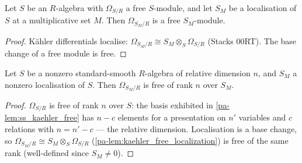 \begin{lemma}
  \label{pa-lem:kaehler_free_localization}
  \leanok

  Let \(S\) be an \(R\)-algebra with \(\Omega_{S/R}\) a free \(S\)-module, and
  let \(S_M\) be a localisation of \(S\) at a multiplicative set \(M\). Then
  \(\Omega_{S_M/R}\) is a free \(S_M\)-module.
\end{lemma}
\begin{proof}
  \leanok
  K\"ahler differentials localise:
  \(\Omega_{S_M/R} \cong S_M \otimes_S \Omega_{S/R}\) (Stacks 00RT). The base
  change of a free module is free.
\end{proof}

\begin{lemma}
  \label{pa-lem:kaehler_rank_localization}
  \leanok

  Let \(S\) be a nonzero standard-smooth \(R\)-algebra of relative dimension
  \(n\), and \(S_M\) a nonzero localisation of \(S\). Then \(\Omega_{S_M/R}\)
  is free of rank \(n\) over \(S_M\).
\end{lemma}
\begin{proof}
  \leanok
  \(\Omega_{S/R}\) is free of rank \(n\) over \(S\): the basis exhibited in
  \ref{pa-lem:ss_kaehler_free} has \(n - c\) elements for a presentation on \(n'\)
  variables and \(c\) relations with \(n = n' - c\) --- the relative dimension.
  Localisation is a base change, so \(\Omega_{S_M/R} \cong S_M \otimes_S
  \Omega_{S/R}\) (\ref{pa-lem:kaehler_free_localization}) is free of the same rank
  (well-defined since \(S_M \neq 0\)).
\end{proof}

